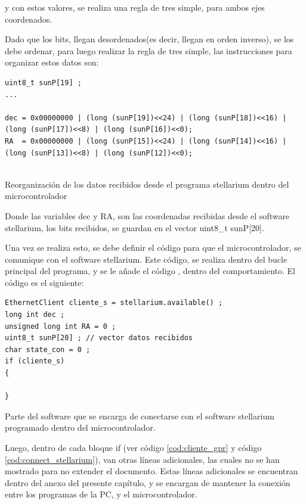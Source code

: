 y con estos valores, se realiza una regla de tres simple, para ambos ejes coordenados. 

Dado que los bits, llegan desordenados(es decir, llegan en orden inverso), se los debe ordenar, para luego realizar la regla de tres simple, las instrucciones para organizar estos datos son: 

\begin{listing}[H]
\begin{verbatim}
uint8_t sunP[19] ; 
... 

dec = 0x00000000 | (long (sunP[19])<<24) | (long (sunP[18])<<16) | (long (sunP[17])<<8) | (long (sunP[16])<<0);
RA  = 0x00000000 | (long (sunP[15])<<24) | (long (sunP[14])<<16) | (long (sunP[13])<<8) | (long (sunP[12])<<0);
 	
\end{verbatim}
\caption{Reorganización de los datos recibidos desde el programa stellarium dentro del microcontrolador}
\label{cod:bitwise_order}
\end{listing}

Donde las variables dec y RA, son las coordenadas recibidas desde el software stellarium, los bits recibidos, se guardan en el vector uint8\_t sunP[20].

Una vez se realiza esto, se debe definir el código para que el microcontrolador, se comunique con el software stellarium. Este código, se realiza dentro del bucle principal del programa, y se le añade el código \label{cod:bitwise_order}, dentro del comportamiento. El código es el siguiente: 

\begin{listing}[ht!]
	\begin{verbatim}
EthernetClient cliente_s = stellarium.available() ; 
long int dec ; 
unsigned long int RA = 0 ; 
uint8_t sunP[20] ; // vector datos recibidos 
char state_con = 0 ; 
if (cliente_s)
{
	
}
	\end{verbatim}
\caption{Parte del software que se encarga de conectarse con el software stellarium programado dentro del microcontrolador.}
\label{cod:connect_stellarium}
\end{listing} 

Luego, dentro de cada bloque if (ver código \ref{cod:cliente_gpr} y código \ref{cod:connect_stellarium}), van otras líneas adicionales, las cuales no se han mostrado para no extender el documento. Estas líneas adicionales se encuentran dentro del anexo del presente capítulo, y se encargan de mantener la conexión entre los programas de la PC, y el microcontrolador. 
   
